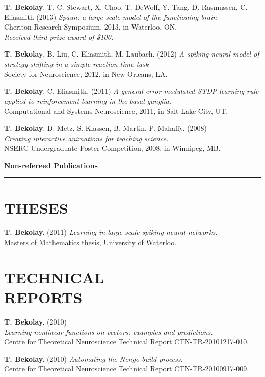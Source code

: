 \documentclass[line,margin]{res}
\begin{document}
\begin{resume}
\textbf{T. Bekolay}, T. C. Stewart, X. Choo, T. DeWolf, Y. Tang,
D. Rasmussen, C. Eliasmith (2013)
  {\sl Spaun: a large-scale model of the functioning brain} \\
  Cheriton Research Symposium, 2013, in Waterloo, ON. \\
  {\sl Received third prize award of \$100.}

\textbf{T. Bekolay}, B. Liu, C. Eliasmith, M. Laubach. (2012)
  {\sl A spiking neural model of strategy shifting in a simple
  reaction time task} \\
  Society for Neuroscience, 2012, in New Orleans, LA.

\textbf{T. Bekolay}, C. Eliasmith. (2011)
  {\sl A general error-modulated STDP learning rule applied to
  reinforcement learning in the basal ganglia.} \\
  Computational and Systems Neuroscience, 2011, in Salt Lake City, UT.

\textbf{T. Bekolay}, D. Metz, S. Klassen, B. Martin, P. Mahaffy. (2008) \\
  {\sl Creating interactive animations for teaching science.} \\
  NSERC Undergraduate Poster Competition, 2008, in Winnipeg, MB.
  \vspace{0.42em}

{\Large \bf Non-refereed Publications} \\ \vspace{-8pt} \hrule

\section{THESES}

\textbf{T. Bekolay.} (2011)
  {\sl Learning in large-scale spiking neural networks.} \\
  Masters of Mathematics thesis, University of Waterloo.

\section{TECHNICAL \\REPORTS}

\textbf{T. Bekolay.} (2010) \\
  {\sl Learning nonlinear functions on vectors: examples and predictions.} \\
  Centre for Theoretical Neuroscience Technical Report CTN-TR-20101217-010.

\textbf{T. Bekolay.} (2010)
  {\sl Automating the Nengo build process.} \\
  Centre for Theoretical Neuroscience Technical Report CTN-TR-20100917-009.


\end{resume}
\end{document}
